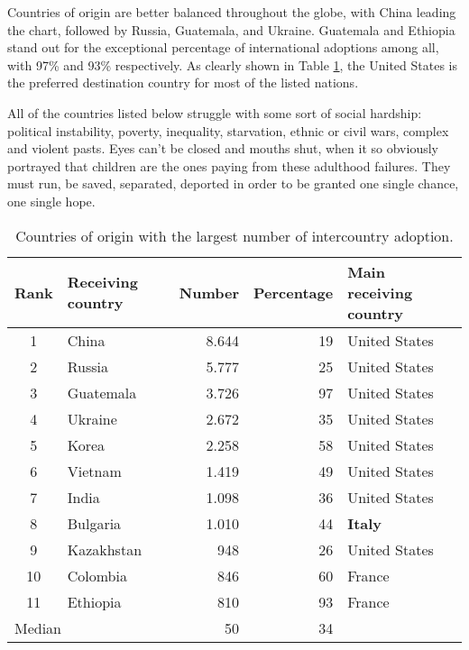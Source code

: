 Countries of origin are better balanced throughout the globe, with China leading the chart, followed by Russia, Guatemala, and Ukraine. Guatemala and Ethiopia stand out for the exceptional percentage of international adoptions among all, with 97\% and 93\% respectively. As clearly shown in Table \ref{tab:intadoptcountriesorigin}, the United States is the preferred destination country for most of the listed nations. 

All of the countries listed below struggle with some sort of social hardship: political instability, poverty, inequality, starvation, ethnic or civil wars, complex and violent pasts. Eyes can't be closed and mouths shut, when it so obviously portrayed that children are the ones paying from these adulthood failures. They must run, be saved, separated, deported in order to be granted one single chance, one single hope.

\begin{table}[H]
   \centering
   \begin{tabular}{c l r r l}
      Rank & Receiving country\footnotemark[1] & Number & Percentage & Main receiving country\\
      \hline
      1 & China & 8.644 & 19 & United States\\
      2 & Russia & 5.777 & 25 & United States\\
      3 & Guatemala & 3.726 & 97 & United States\\
      4 & Ukraine & 2.672 & 35 & United States\\
      5 & Korea & 2.258 & 58 & United States\\
      6 & Vietnam & 1.419 & 49 & United States\\
      7 & India & 1.098 & 36 & United States\\
      8 & Bulgaria & 1.010 & 44 &  \textcolor{BrickRed}{\textbf{Italy}}\\
      9 & Kazakhstan & 948 & 26 & United States\\
      10 & Colombia & 846 & 60 & France\\
      11 & Ethiopia & 810 & 93 & France\\
      \hline
      \multicolumn{2}{l}{Median} & 50 & 34 &\\
   \end{tabular}
   \caption{Countries of origin with the largest number of intercountry adoption.}
    \label{tab:intadoptcountriesorigin}
\end{table}

